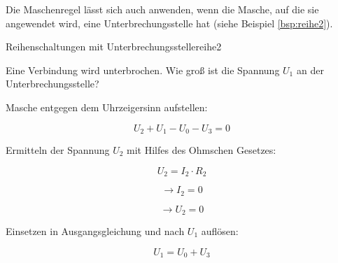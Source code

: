 \begin{frame}
{		Die Maschenregel lässt sich auch anwenden, wenn die Masche, auf die sie angewendet wird, eine Unterbrechungsstelle hat (siehe Beispiel \ref{bsp:reihe2}).

		\begin{bsp}{Reihenschaltungen mit Unterbrechungsstelle}{reihe2}


			Eine Verbindung wird unterbrochen. Wie groß ist die Spannung $U_1$ an der Unterbrechungsstelle?

			\begin{center}



			\end{center}

			Masche entgegen dem Uhrzeigersinn aufstellen:


			\begin{equation*}
				U_2+U_1-U_0-U_3 = 0
			\end{equation*}

			Ermitteln der Spannung $U_2$ mit Hilfes des Ohmschen Gesetzes:


			\begin{equation*}
				U_2=I_2 \cdot R_2
			\end{equation*}

			\begin{equation*}
				\rightarrow I_2 = 0
			\end{equation*}

			\begin{equation*}
				\rightarrow U_2 = 0
			\end{equation*}

			Einsetzen in Ausgangsgleichung und nach $U_1$ auflösen:

			\begin{equation*}
				U_1 = U_0 + U_3
			\end{equation*}



\end{bsp}}
\end{frame}
